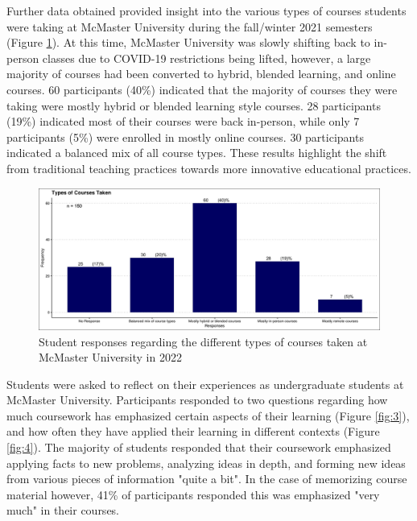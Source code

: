 \documentclass[10pt]{article}
\providecommand{\figref}[1]{(Figure \ref{#1})}  %
\begin{document}
Further data obtained provided insight into the various types of courses students were taking at McMaster University during the fall/winter 2021 semesters \figref{fig:2}. At this time, McMaster University was slowly shifting back to in-person classes due to COVID-19 restrictions being lifted, however, a large majority of courses had been converted to hybrid, blended learning, and online courses. 60 participants (40\%) indicated that the majority of courses they were taking were mostly hybrid or blended learning style courses. 28 participants (19\%) indicated most of their courses were back in-person, while only 7 participants (5\%) were enrolled in mostly online courses. 30 participants indicated a balanced mix of all course types. These results highlight the shift from traditional teaching practices towards more innovative educational practices.

\begin{figure}[H]
	\includegraphics[width=\textwidth]{figures_4f06/types_of_courses_taken.jpg}
	\caption{Student responses regarding the different types of courses taken at McMaster University in 2022}
	\label{fig:2}
\end{figure}

Students were asked to reflect on their experiences as undergraduate students at McMaster University. Participants responded to two questions regarding how much coursework has emphasized certain aspects of their learning \figref{fig:3}, and how often they have applied their learning in different contexts \figref{fig:4}. The majority of students responded that their coursework emphasized applying facts to new problems, analyzing ideas in depth, and forming new ideas from various pieces of information "quite a bit". In the case of memorizing course material however, 41\% of participants responded this was emphasized "very much" in their courses. 
\end{document}
